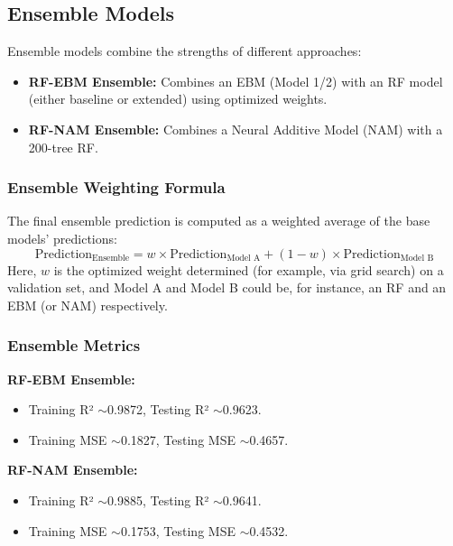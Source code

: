 \documentclass{article}
\begin{document}
\subsection{Ensemble Models}
Ensemble models combine the strengths of different approaches:
\begin{itemize}
    \item \textbf{RF-EBM Ensemble:} Combines an EBM (Model 1/2) with an RF model (either baseline or extended) using optimized weights.
    \item \textbf{RF-NAM Ensemble:} Combines a Neural Additive Model (NAM) with a 200-tree RF.
\end{itemize}

\subsubsection*{Ensemble Weighting Formula}
The final ensemble prediction is computed as a weighted average of the base models' predictions:
\[
\text{Prediction}_{\text{Ensemble}} = w \times \text{Prediction}_{\text{Model A}} + (1 - w) \times \text{Prediction}_{\text{Model B}}
\]
Here, \(w\) is the optimized weight determined (for example, via grid search) on a validation set, and Model A and Model B could be, for instance, an RF and an EBM (or NAM) respectively.

\subsubsection*{Ensemble Metrics}
\textbf{RF-EBM Ensemble:}
\begin{itemize}
    \item Training R² $\sim$0.9872, Testing R² $\sim$0.9623.
    \item Training MSE $\sim$0.1827, Testing MSE $\sim$0.4657.
\end{itemize}
\textbf{RF-NAM Ensemble:}
\begin{itemize}
    \item Training R² $\sim$0.9885, Testing R² $\sim$0.9641.
    \item Training MSE $\sim$0.1753, Testing MSE $\sim$0.4532.
\end{itemize}
\end{document}
